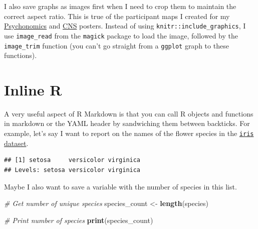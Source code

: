 \documentclass[
]{book}
\newenvironment{Shaded}{\begin{snugshade}}{\end{snugshade}}
\newcommand{\CommentTok}[1]{\textcolor[rgb]{0.56,0.35,0.01}{\textit{#1}}}
\newcommand{\KeywordTok}[1]{\textcolor[rgb]{0.13,0.29,0.53}{\textbf{#1}}}
\newcommand{\NormalTok}[1]{#1}
\newcommand{\OperatorTok}[1]{\textcolor[rgb]{0.81,0.36,0.00}{\textbf{#1}}}
\newcommand{\StringTok}[1]{\textcolor[rgb]{0.31,0.60,0.02}{#1}}
\begin{document}
I also save graphs as images first when I need to crop them to maintain the correct aspect ratio. This is true of the participant maps I created for my \href{https://github.com/hollzzar/psychonomics-poster/blob/master/Psychonomics.pdf}{Psychonomics} and \href{https://github.com/hollzzar/CNS-2020-poster/blob/master/CNS_2020.pdf}{CNS} posters. Instead of using \texttt{knitr::include\_graphics}, I use \texttt{image\_read} from the \texttt{magick} package to load the image, followed by the \texttt{image\_trim} function (you can't go straight from a \texttt{ggplot} graph to these functions).

\hypertarget{rintext}{%
\section{Inline R}\label{rintext}}

A very useful aspect of R Markdown is that you can call R objects and functions in markdown or the YAML header by sandwiching them between backticks. For example, let's say I want to report on the names of the flower species in the \href{https://archive.ics.uci.edu/ml/datasets/iris}{\texttt{iris} dataset}.

\begin{Shaded}
\end{Shaded}

\begin{verbatim}
## [1] setosa     versicolor virginica 
## Levels: setosa versicolor virginica
\end{verbatim}

Maybe I also want to save a variable with the number of species in this list.

\begin{Shaded}
\begin{Highlighting}[]
\CommentTok{# Get number of unique species}
\NormalTok{species_count <-}\StringTok{ }\KeywordTok{length}\NormalTok{(species)}

\CommentTok{# Print number of species}
\KeywordTok{print}\NormalTok{(species_count)}
\end{Highlighting}
\end{Shaded}
\end{document}
